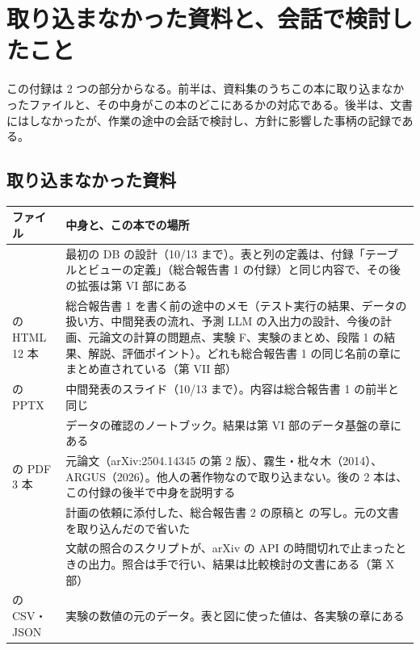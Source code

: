 \chapter{取り込まなかった資料と、会話で検討したこと}\label{app:others}

この付録は 2 つの部分からなる。前半は、資料集のうちこの本に取り込まなかったファイルと、その中身がこの本のどこにあるかの対応である。後半は、文書にはしなかったが、作業の途中の会話で検討し、方針に影響した事柄の記録である。

\section{取り込まなかった資料}

\begin{longtable}{P{5.6cm}P{8.8cm}}
\toprule
\textbf{ファイル} & \textbf{中身と、この本での場所} \\
\midrule
\endhead
\bottomrule
\endfoot
{} & 最初の DB の設計（10/13 まで）。表と列の定義は、付録「テーブルとビューの定義」（総合報告書 1 の付録）と同じ内容で、その後の拡張は第 VI 部にある \\
 の HTML 12 本 & 総合報告書 1 を書く前の途中のメモ（テスト実行の結果、データの扱い方、中間発表の流れ、予測 LLM の入出力の設計、今後の計画、元論文の計算の問題点、実験 F、実験のまとめ、段階 1 の結果、解説、評価ポイント）。どれも総合報告書 1 の同じ名前の章にまとめ直されている（第 VII 部） \\
 の PPTX & 中間発表のスライド（10/13 まで）。内容は総合報告書 1 の前半と同じ \\
 & データの確認のノートブック。結果は第 VI 部のデータ基盤の章にある \\
 の PDF 3 本 & 元論文（arXiv:2504.14345 の第 2 版）、霧生・枇々木（2014）、ARGUS（2026）。他人の著作物なので取り込まない。後の 2 本は、この付録の後半で中身を説明する \\
 & 計画の依頼に添付した、総合報告書 2 の原稿と  の写し。元の文書を取り込んだので省いた \\
 & 文献の照合のスクリプトが、arXiv の API の時間切れで止まったときの出力。照合は手で行い、結果は比較検討の文書にある（第 X 部） \\
 の CSV・JSON & 実験の数値の元のデータ。表と図に使った値は、各実験の章にある \\
\end{longtable}

